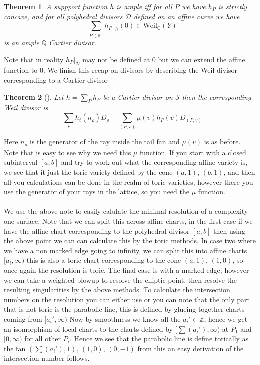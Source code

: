 \documentclass[12pt,a4paper]{book}      %
\newtheorem{thm}{Theorem}[section]
\theoremstyle{definition}
\begin{document}
\begin{thm}\cite{Suss}
A suppport function $h$ is ample iff for all $P$ we have $h_P$ is strictly concave, and for all polyhedral divisors $\mathcal{D}$ defined on an affine curve we have
\[
- \sum_{P \in \mathbb{P}^1} h_P |_\mathcal{D} (0) \in \text{Weil}_\mathbb{Q} (Y)
\]
 is an ample $\mathbb{Q}$ Cartier divisor.
\end{thm}
Note that in reality $h_P |_\mathcal{D}$ may not be defined at $0$ but we can extend the affine function to $0$. We finish this recap on divisors by describing the Weil divisor corresponding to a Cartier divisor
\begin{thm}[\cite{PS}]
Let $h = \sum_P h_P$ be a Cartier divisor on $\mathcal{S}$ then the corresponding Weil divisor is 
\[
- \sum_\rho h_t ( n_\rho) D_\rho - \sum_{(P, v)} \mu(v) h_P(v) D_{(P,v)}
\]
\end{thm}
Here $n_\rho$ is the generator of the ray inside the tail fan and $\mu(v)$ is as before. Note that is easy to see why we need this $\mu$ function. If you start with a closed subinterval $[a, b]$ and try to work out what the corresponding affine variety is, we see that it just the toric variety defined by the cone $(a,1), \, (b,1)$, and then all you calculations can be done in the realm of toric varieties, however there you use the generator of your rays in the lattice, so you need the $\mu$ function.
\\
\\
We use the above note to easily calulate the minimal resolution of a complexity one surface. Note that we can split this across affine charts, in the first case if we have the affine chart corresponding to the polyhedral divisor $[a,b]$ then using the above point we can can calculate this by the toric methods. In case two where we have a non marked edge going to infinity, we can split this into affine charts $[a_i, \infty)$ this is also a toric chart corresponding to the cone $(a,1), \, (1,0)$, so once again the resolution is toric. The final case is with a marked edge, however we can take a weighted blowup to resolve the elliptic point, then resolve the resulting singularities by the above methods. To calculate the intersection numbers on the resolution you can either use \cite{Suss} or you can note that the only part that is not toric is the parabolic line, this is defined by glueing together charts coming from $[a_i', \infty)$ Now by smoothness we know all the  $a_i' \in \mathbb{Z}$, hence we get an isomorphism of local charts to the charts defined by $[\sum(a_i'), \infty)$ at $P_1$ and $[0, \infty)$ for all other $P_i$. Hence we see that the parabolic line is define torically as the fan  
$(\sum(a_i'), 1), \, (1, 0), \,(0, -1)$ from this an easy derivation of the intersection number follows.
\end{document}
